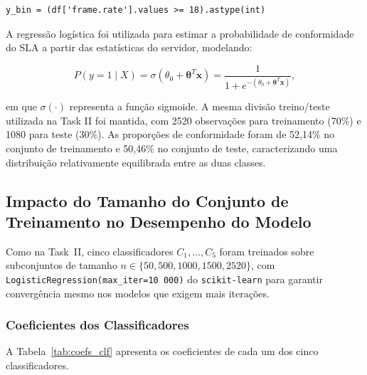 \documentclass[11pt,a4paper]{article}
\begin{document}
\begin{lstlisting}
y_bin = (df['frame.rate'].values >= 18).astype(int)
\end{lstlisting}

A regressão logística foi utilizada para estimar a probabilidade de conformidade do SLA a partir das estatísticas do servidor, modelando:

\begin{equation}
    P(y=1\mid X)=\sigma(\theta_0+\boldsymbol{\theta}^T\mathbf{x})
    =\frac{1}{1+e^{-(\theta_0+\boldsymbol{\theta}^T\mathbf{x})}},
\end{equation}

em que $\sigma(\cdot)$ representa a função sigmoide. A mesma divisão treino/teste utilizada na Task II foi mantida, com 2520 observações para treinamento (70\%) e 1080 para teste (30\%). As proporções de conformidade foram de 52{,}14\% no conjunto de treinamento e 50{,}46\% no conjunto de teste, caracterizando uma distribuição relativamente equilibrada entre as duas classes.


\subsection{Impacto do Tamanho do Conjunto de Treinamento no Desempenho do Modelo}

Como na Task~II, cinco classificadores $C_1, \ldots, C_5$ foram treinados sobre subconjuntos de tamanho $n \in \{50, 500, 1000, 1500, 2520\}$, com \texttt{LogisticRegression(max\_iter=10\,000)} do \texttt{scikit-learn} para garantir convergência mesmo nos modelos que exigem mais iterações.

\subsubsection{Coeficientes dos Classificadores}

A Tabela~\ref{tab:coefs_clf} apresenta os coeficientes de cada um dos cinco classificadores.
\end{document}
